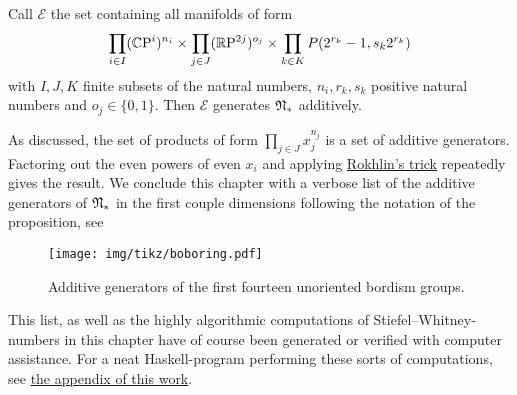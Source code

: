 \begin{thesisprop}\label{eprop}
    Call $\mathcal{E}$ the set containing all manifolds of form
    \begin{equation*}
        \prod\limits_{i\in I} (\mathbb{C}\mathrm{P}^i)^{n_i} \times \prod\limits_{j\in J} (\mathbb{R}\mathrm{P}^{2j})^{o_j} \times \prod\limits_{k\in K}{P(2^{r_k} - 1,s_k2^{r_k})}
    \end{equation*}
    with $I,J,K$ finite subsets of the natural numbers, $n_i,r_k,s_k$ positive natural numbers and $o_j \in \{0,1\}$.
    Then $\mathcal{E}$ generates $\mathfrak{N}_\ast$ additively.
\end{thesisprop}
\prf
As discussed, the set of products of form $\prod_{j\in J} x_j^{n_j}$ is a set of additive generators.
Factoring out the even powers of even $x_i$ and applying \hyperref[rokhlintrick]{Rokhlin's trick} repeatedly gives the result.
\endprf
We conclude this chapter with a verbose list of the additive generators of $\mathfrak{N}_\ast$ in the first couple dimensions following the notation of the proposition, see 
\begin{figure}
    \centering
    \texttt{[image: img/tikz/boboring.pdf]}
    \caption{Additive generators of the first fourteen unoriented bordism groups.}\label{fig:boboring}
\end{figure}
This list, as well as the highly algorithmic computations of Stiefel--Whitney-numbers in this chapter have of course been generated or verified with computer assistance.
For a neat Haskell-program performing these sorts of computations, see \hyperlink{appendix}{the appendix of this work}.
